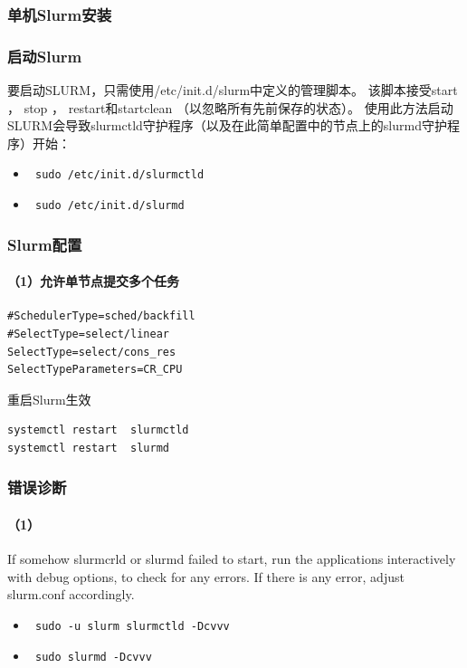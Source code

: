 {\subsubsection{单机Slurm安装}




\subsubsection{启动Slurm}
要启动SLURM，只需使用/etc/init.d/slurm中定义的管理脚本。 该脚本接受start ， stop ， restart和startclean （以忽略所有先前保存的状态）。 使用此方法启动SLURM会导致slurmctld守护程序（以及在此简单配置中的节点上的slurmd守护程序）开始：
\begin{itemize}
\item \verb| sudo /etc/init.d/slurmctld|

\item \verb| sudo /etc/init.d/slurmd|
\end{itemize}



\subsubsection{Slurm配置}
\paragraph{（1）允许单节点提交多个任务}
\begin{verbatim}
#SchedulerType=sched/backfill
#SelectType=select/linear
SelectType=select/cons_res
SelectTypeParameters=CR_CPU
\end{verbatim}
重启Slurm生效
\begin{verbatim}
systemctl restart  slurmctld
systemctl restart  slurmd
\end{verbatim}


\subsubsection{错误诊断}
\paragraph{（1）}
If somehow slurmcrld or slurmd failed to start, run the applications interactively with debug options, to check for any errors. If there is any error, adjust slurm.conf accordingly.
\begin{itemize}
\item \verb| sudo -u slurm slurmctld -Dcvvv |
\item \verb| sudo slurmd -Dcvvv |
\end{itemize}

}
